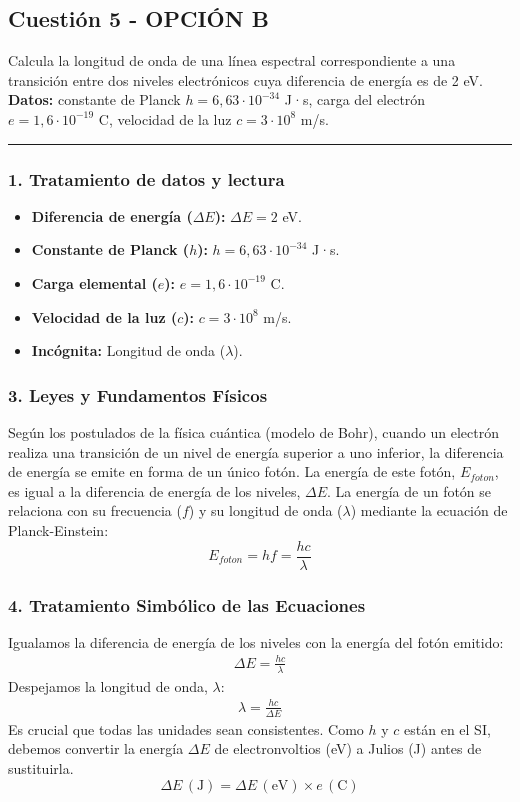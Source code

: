 \newpage

\subsection{Cuestión 5 - OPCIÓN B}
\label{subsec:5B_2010_jun_ord}
\begin{cajaenunciado}
Calcula la longitud de onda de una línea espectral correspondiente a una transición entre dos niveles electrónicos cuya diferencia de energía es de 2 eV.
\textbf{Datos:} constante de Planck $h=6,63 \cdot 10^{-34}$ J·s, carga del electrón $e=1,6 \cdot 10^{-19}$ C, velocidad de la luz $c=3 \cdot 10^8$ m/s.
\end{cajaenunciado}
\hrule

\subsubsection*{1. Tratamiento de datos y lectura}
\begin{itemize}
    \item \textbf{Diferencia de energía ($\Delta E$):} $\Delta E = 2$ eV.
    \item \textbf{Constante de Planck ($h$):} $h = 6,63 \cdot 10^{-34}$ J·s.
    \item \textbf{Carga elemental ($e$):} $e = 1,6 \cdot 10^{-19}$ C.
    \item \textbf{Velocidad de la luz ($c$):} $c = 3 \cdot 10^8$ m/s.
    \item \textbf{Incógnita:} Longitud de onda ($\lambda$).
\end{itemize}

\subsubsection*{3. Leyes y Fundamentos Físicos}
Según los postulados de la física cuántica (modelo de Bohr), cuando un electrón realiza una transición de un nivel de energía superior a uno inferior, la diferencia de energía se emite en forma de un único fotón.
La energía de este fotón, $E_{foton}$, es igual a la diferencia de energía de los niveles, $\Delta E$.
La energía de un fotón se relaciona con su frecuencia ($f$) y su longitud de onda ($\lambda$) mediante la ecuación de Planck-Einstein:
$$ E_{foton} = hf = \frac{hc}{\lambda} $$

\subsubsection*{4. Tratamiento Simbólico de las Ecuaciones}
Igualamos la diferencia de energía de los niveles con la energía del fotón emitido:
\begin{gather}
    \Delta E = \frac{hc}{\lambda}
\end{gather}
Despejamos la longitud de onda, $\lambda$:
\begin{gather}
    \lambda = \frac{hc}{\Delta E}
\end{gather}
Es crucial que todas las unidades sean consistentes. Como $h$ y $c$ están en el SI, debemos convertir la energía $\Delta E$ de electronvoltios (eV) a Julios (J) antes de sustituirla.
$$ \Delta E \, (\text{J}) = \Delta E \, (\text{eV}) \times e \, (\text{C}) $$

